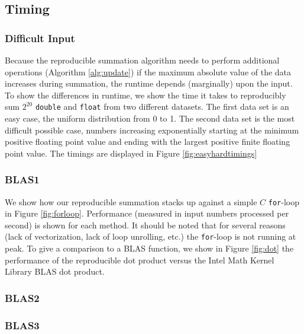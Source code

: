 \subsection{Timing}
  \subsubsection{Difficult Input}
    Because the reproducible summation algorithm needs to perform additional operations (Algorithm \ref{alg:update}) if the maximum absolute value of the data increases during summation, the runtime depends (marginally) upon the input. To show the differences in runtime, we show the time it takes to reproducibly sum $2^20$ \texttt{double} and \texttt{float} from two different datasets. The first data set is an easy case, the uniform distribution from 0 to 1. The second data set is the most difficult possible case, numbers increasing exponentially starting at the minimum positive floating point value and ending with the largest positive finite floating point value. The timings are displayed in Figure \ref{fig:easyhardtimings}
  \subsubsection{BLAS1}
    We show how our reproducible summation stacks up against a simple $C$ \texttt{for}-loop in Figure \ref{fig:forloop}. Performance (measured in input numbers processed per second) is shown for each method. It should be noted that for several reasons (lack of vectorization, lack of loop unrolling, etc.) the \texttt{for}-loop is not running at peak.
    To give a comparison to a BLAS function, we show in Figure \ref{fig:dot} the performance of the reproducible dot product versus the Intel Math Kernel Library \cite{MKL} BLAS dot product.
  \subsubsection{BLAS2}
  \subsubsection{BLAS3}
